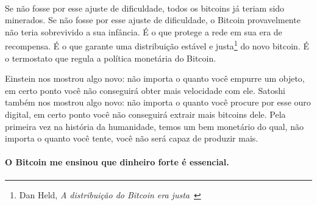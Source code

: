 \paragraph{}
Se não fosse por esse ajuste de dificuldade, todos os bitcoins já teriam sido minerados. Se não fosse por esse ajuste de dificuldade, o Bitcoin provavelmente não teria sobrevivido a sua infância. É o que protege a rede em sua era de recompensa. É o que garante uma distribuição estável e justa\footnote{Dan Held, \textit{A distribuição do Bitcoin era justa}~\cite{distribution-was-fair}} do novo bitcoin. É o termostato que regula a política monetária do Bitcoin.

Einstein nos mostrou algo novo: não importa o quanto você empurre um objeto, em certo ponto você não conseguirá obter mais velocidade com ele. Satoshi também nos mostrou algo novo: não importa o quanto você procure por esse ouro digital, em certo ponto você não conseguirá extrair mais bitcoins dele. Pela primeira vez na história da humanidade, temos um bem monetário do qual, não importa o quanto você tente, você não será capaz de produzir mais.

\paragraph{O Bitcoin me ensinou que dinheiro forte é essencial.}

%
%
%
%
%
%
%
%
